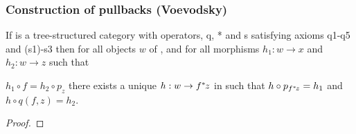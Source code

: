 \documentclass[10pt,a4paper]{scrartcl}
\renewcommand{\sub}{^*\kern-1pt}
\begin{document}
\subsubsection{Construction of pullbacks (Voevodsky)}

\begin{lemma}
 If  is a tree-structured category with operators, q, * and s satisfying
axioms q1-q5 and (s1)-s3 then for all objects $w$ of , and for all
morphisms $h_1: w \rightarrow x$ and $h_2: w \rightarrow z$  such that

$h_1 \circ f = h_2 \circ p_z$ 
there exists a unique $h:w \rightarrow f \sub z$ in    such that
$h \circ p_{f \sub z} = h_1$ and $h \circ q(f,z) = h_2$.
\end{lemma}
\begin{proof}


\end{proof}
\end{document}
